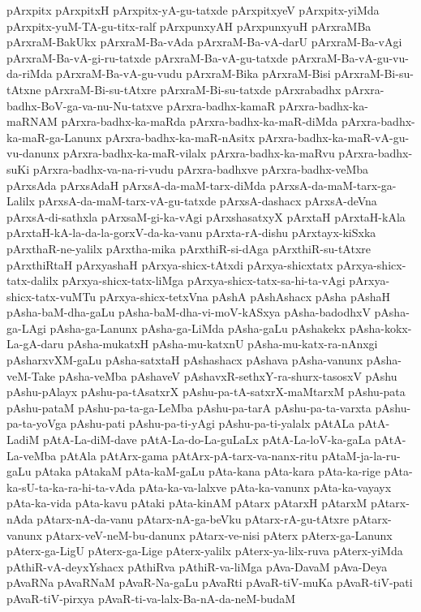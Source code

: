 {pArxpitx
pArxpitxH
pArxpitx-yA-gu-tatxde
pArxpitxyeV
pArxpitx-yiMda
pArxpitx-yuM-TA-gu-titx-ralf
pArxpunxyAH
pArxpunxyuH
pArxraMBa
pArxraM-BakUkx
pArxraM-Ba-vAda
pArxraM-Ba-vA-darU
pArxraM-Ba-vAgi
pArxraM-Ba-vA-gi-ru-tatxde
pArxraM-Ba-vA-gu-tatxde
pArxraM-Ba-vA-gu-vu-da-riMda
pArxraM-Ba-vA-gu-vudu
pArxraM-Bika
pArxraM-Bisi
pArxraM-Bi-su-tAtxne
pArxraM-Bi-su-tAtxre
pArxraM-Bi-su-tatxde
pArxrabadhx
pArxra-badhx-BoV-ga-va-nu-Nu-tatxve
pArxra-badhx-kamaR
pArxra-badhx-ka-maRNAM
pArxra-badhx-ka-maRda
pArxra-badhx-ka-maR-diMda
pArxra-badhx-ka-maR-ga-Lanunx
pArxra-badhx-ka-maR-nAsitx
pArxra-badhx-ka-maR-vA-gu-vu-danunx
pArxra-badhx-ka-maR-vilalx
pArxra-badhx-ka-maRvu
pArxra-badhx-suKi
pArxra-badhx-va-na-ri-vudu
pArxra-badhxve
pArxra-badhx-veMba
pArxsAda
pArxsAdaH
pArxsA-da-maM-tarx-diMda
pArxsA-da-maM-tarx-ga-Lalilx
pArxsA-da-maM-tarx-vA-gu-tatxde
pArxsA-dashacx
pArxsA-deVna
pArxsA-di-sathxla
pArxsaM-gi-ka-vAgi
pArxshasatxyX
pArxtaH
pArxtaH-kAla
pArxtaH-kA-la-da-la-gorxV-da-ka-vanu
pArxta-rA-dishu
pArxtayx-kiSxka
pArxthaR-ne-yalilx
pArxtha-mika
pArxthiR-si-dAga
pArxthiR-su-tAtxre
pArxthiRtaH
pArxyashaH
pArxya-shicx-tAtxdi
pArxya-shicxtatx
pArxya-shicx-tatx-dalilx
pArxya-shicx-tatx-liMga
pArxya-shicx-tatx-sa-hi-ta-vAgi
pArxya-shicx-tatx-vuMTu
pArxya-shicx-tetxVna
pAshA
pAshAshacx
pAsha
pAshaH
pAsha-baM-dha-gaLu
pAsha-baM-dha-vi-moV-kASxya
pAsha-badodhxV
pAsha-ga-LAgi
pAsha-ga-Lanunx
pAsha-ga-LiMda
pAsha-gaLu
pAshakekx
pAsha-kokx-La-gA-daru
pAsha-mukatxH
pAsha-mu-katxnU
pAsha-mu-katx-ra-nAnxgi
pAsharxvXM-gaLu
pAsha-satxtaH
pAshashacx
pAshava
pAsha-vanunx
pAsha-veM-Take
pAsha-veMba
pAshaveV
pAshavxR-sethxY-ra-shurx-tasosxV
pAshu
pAshu-pAlayx
pAshu-pa-tAsatxrX
pAshu-pa-tA-satxrX-maMtarxM
pAshu-pata
pAshu-pataM
pAshu-pa-ta-ga-LeMba
pAshu-pa-tarA
pAshu-pa-ta-varxta
pAshu-pa-ta-yoVga
pAshu-pati
pAshu-pa-ti-yAgi
pAshu-pa-ti-yalalx
pAtALa
pAtA-LadiM
pAtA-La-diM-dave
pAtA-La-do-La-guLaLx
pAtA-La-loV-ka-gaLa
pAtA-La-veMba
pAtAla
pAtArx-gama
pAtArx-pA-tarx-va-nanx-ritu
pAtaM-ja-la-ru-gaLu
pAtaka
pAtakaM
pAta-kaM-gaLu
pAta-kana
pAta-kara
pAta-ka-rige
pAta-ka-sU-ta-ka-ra-hi-ta-vAda
pAta-ka-va-lalxve
pAta-ka-vanunx
pAta-ka-vayayx
pAta-ka-vida
pAta-kavu
pAtaki
pAta-kinAM
pAtarx
pAtarxH
pAtarxM
pAtarx-nAda
pAtarx-nA-da-vanu
pAtarx-nA-ga-beVku
pAtarx-rA-gu-tAtxre
pAtarx-vanunx
pAtarx-veV-neM-bu-danunx
pAtarx-ve-nisi
pAterx
pAterx-ga-Lanunx
pAterx-ga-LigU
pAterx-ga-Lige
pAterx-yalilx
pAterx-ya-lilx-ruva
pAterx-yiMda
pAthiR-vA-deyxYshacx
pAthiRva
pAthiR-va-liMga
pAva-DavaM
pAva-Deya
pAvaRNa
pAvaRNaM
pAvaR-Na-gaLu
pAvaRti
pAvaR-tiV-muKa
pAvaR-tiV-pati
pAvaR-tiV-pirxya
pAvaR-ti-va-lalx-Ba-nA-da-neM-budaM
}
